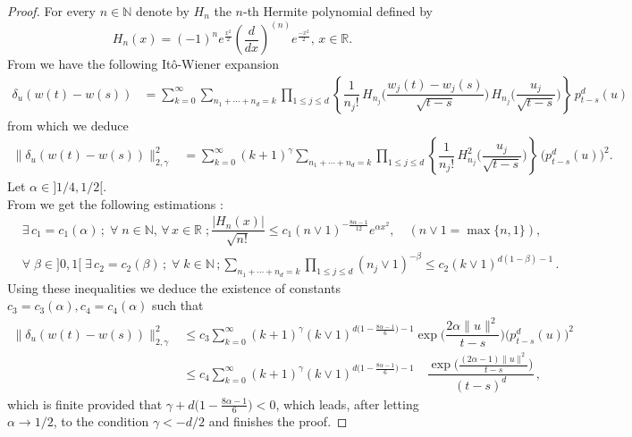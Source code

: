 \documentclass[]{interact}
\newcommand{\R}{{\mathbb{R}}}
\newcommand{\1}{\mathbf{1}}
\newcommand{\N}{{\mathbb N}}
\theoremstyle{plain}%
\theoremstyle{definition}
\theoremstyle{remark}
\begin{document}
\begin{proof}
For every $n\in \N$ denote by $H_n$ the $n$-th Hermite polynomial defined by
$$ H_{n}(x)=(-1)^{n} e^{\frac{x^{2}}{2}} \left( \frac{d}{dx}  \right) ^{(n)} e^{ \frac{-x^{2}}{2}},\, x\in \R.
 $$
 From \cite{IPV95} we have the following It\^{o}-Wiener expansion  
\begin{align*}
 \delta_u(w(t)-w(s)) 
&=\sum_{k= 0}^{\infty}  \sum _{n_1+\cdots+n_d=k} \prod _{1\leqslant j\leqslant d} \left\lbrace  \dfrac{1}{  n_j! }\,H_{n_j}\Big( \dfrac{w_j(t)-w_j(s)}{\sqrt{ t-s} } \Big)\,H_{n_j}\Big( \dfrac{u_j}{\sqrt{ t-s} } \Big) \right\rbrace \,  p^d_{t-s}(u)  
\end{align*} 
from which we deduce 
\begin{align*}
\Big \|  \delta_u(w(t)-w(s)) \Big \|_{2,\gamma}^2
&=\sum_{k= 0}^{\infty}   (k+1)^{\gamma} \sum _{n_1+\cdots+n_d=k} \prod _{1\leqslant j\leqslant d} \left\lbrace  \dfrac{1}{  n_j! }\,H_{n_j}^2\Big( \dfrac{u_j}{\sqrt{ t-s} } \Big) \right\rbrace \,  \Big( p^d_{t-s}(u)  \Big)^2.
\end{align*} 
Let $\alpha   \in \big ]1/4, 1/2 \big [$.\\
From \cite{IPV95} we get the following estimations : 
\begin{align*}
& \exists \, c_1=c_1(\alpha)\, ; \; \forall \; n\in \N,\, \forall \,x\in \R\; ; \dfrac{|H_n(x)|}{ \sqrt{n!} }\leqslant c_1 (n\vee 1)^{ -\frac{8\alpha -1}{12}} e^{\alpha x^2}, \quad ( n\vee 1=\max \{n,1\}), \\
& \forall \; \beta \in ]0,1[\; \exists \, c_2=c_2( \beta)\, ; \; \forall \; k\in \N\, ; \sum _{n_1+\cdots+n_d=k} \prod _{1\leqslant j\leqslant d} (n_j\vee 1)^{ -\beta } \leqslant c_2 (k\vee 1)^{ d( 1-\beta ) -1} \,.
\end{align*}
Using these inequalities we deduce the existence of constants $c_3=c_3(\alpha),c_4=c_4(\alpha) $ such that 
\begin{align*}
\Big \| \delta_u(w(t)-w(s)) \Big \|_{2,\gamma}^2 
&\leqslant  c_3 \sum_{k= 0}^{\infty}   (k+1)^{\gamma}  (k\vee 1)^{ d\big( 1-\frac{8\alpha -1}{6} \big) -1}  \exp \Big( \dfrac{2\alpha \|u\|^2}{t-s} \Big)\Big( p^d_{t-s}(u)  \Big)^2\\
&\leqslant  c_4 \sum_{k= 0}^{\infty}   (k+1)^{\gamma}  (k\vee 1)^{ d\big( 1-\frac{8\alpha -1}{6} \big) -1}\quad  \dfrac{ \exp \Big( \frac{(2\alpha-1) \|u\|^2}{t-s} \Big)}{ (t-s)^d }\,,
\end{align*}
which is finite provided that $ \gamma+d\big( 1-\frac{8\alpha -1}{6} \big)  <0 $, which leads, after letting $\alpha\to 1/2$, to the condition $\gamma < -d/2$ and finishes the proof.
\end{proof}
\end{document}
